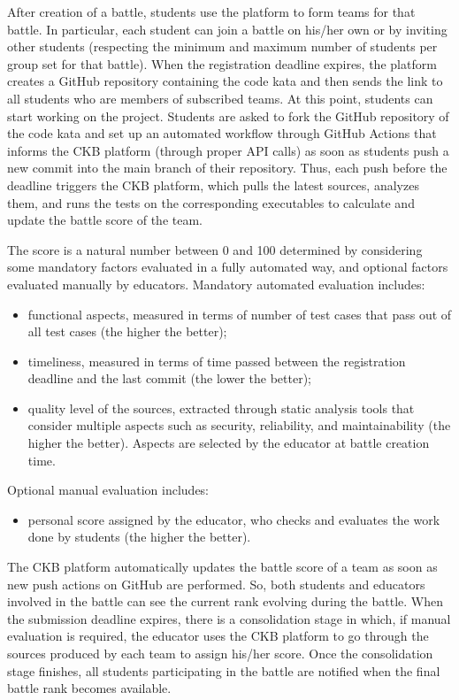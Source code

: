 After creation of a battle, students use the platform to form teams for that battle. In particular, each student can join a battle on his/her own or by inviting other students (respecting the minimum and maximum number of students per group set for that battle). When the registration deadline expires, the platform creates a GitHub repository containing the code kata and then sends the link to all students who are members of subscribed teams. At this point, students can start working on the project. Students are asked to fork the GitHub repository of the code kata and set up an automated workflow through GitHub Actions that informs the CKB platform (through proper API calls) as soon as students push a new commit into the main branch of their repository. Thus, each push before the deadline triggers the CKB platform, which pulls the latest sources, analyzes them, and runs the tests on the corresponding executables to calculate and update the battle score of the team. 


The score is a natural number between 0 and 100 determined by considering some mandatory factors evaluated in a fully automated way, and optional factors evaluated manually by educators. Mandatory automated evaluation includes: 
\begin{itemize}
    \item functional aspects, measured in terms of number of test cases that pass out of all test cases (the higher the better); 
    \item timeliness, measured in terms of time passed between the registration deadline and the last commit (the lower the better); 
    \item quality level of the sources, extracted through static analysis tools that consider multiple aspects such as security, reliability, and maintainability (the higher the better). Aspects are selected by the educator at battle creation time.
\end{itemize}
Optional manual evaluation includes: 
\begin{itemize}
    \item personal score assigned by the educator, who checks and evaluates the work done by students (the higher the better). 
\end{itemize}

The CKB platform automatically updates the battle score of a team as soon as new push actions on GitHub are performed. So, both students and educators involved in the battle can see the current rank evolving during the battle. When the submission deadline expires, there is a consolidation stage in which, if manual evaluation is required, the educator uses the CKB platform to go through the sources produced by each team to assign his/her score. Once the consolidation stage finishes, all students participating in the battle are notified when the final battle rank becomes available. 


